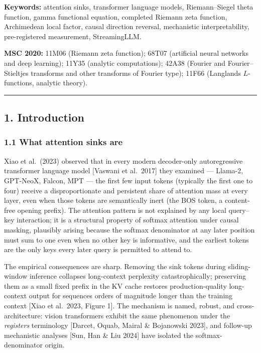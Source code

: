 \documentclass[
  letterpaper,
  11pt]{article}
\theoremstyle{plain}
\theoremstyle{definition}
\theoremstyle{remark}
\begin{document}
{
\setcounter{tocdepth}{3}
\tableofcontents
}
\textbf{Keywords:} attention sinks, transformer language models, Riemann--Siegel theta function, gamma functional equation, completed Riemann zeta function, Archimedean local factor, causal direction reversal, mechanistic interpretability, pre-registered measurement, StreamingLLM.

\textbf{MSC 2020:} 11M06 (Riemann zeta function); 68T07 (artificial neural networks and deep learning); 11Y35 (analytic computations); 42A38 (Fourier and Fourier--Stieltjes transforms and other transforms of Fourier type); 11F66 (Langlands \(L\)-functions, analytic theory).

\begin{center}\rule{0.5\linewidth}{0.5pt}\end{center}

\subsection{1. Introduction}\label{introduction}

\subsubsection{1.1 What attention sinks are}\label{what-attention-sinks-are}

Xiao et al.~(2023) observed that in every modern decoder-only autoregressive transformer language model {[}Vaswani et al.~2017{]} they examined --- Llama-2, GPT-NeoX, Falcon, MPT --- the first few input tokens (typically the first one to four) receive a disproportionate and persistent share of attention mass at every layer, even when those tokens are semantically inert (the BOS token, a content-free opening prefix). The attention pattern is not explained by any local query--key interaction; it is a structural property of softmax attention under causal masking, plausibly arising because the softmax denominator at any later position must sum to one even when no other key is informative, and the earliest tokens are the only keys every later query is permitted to attend to.

The empirical consequences are sharp. Removing the sink tokens during sliding-window inference collapses long-context perplexity catastrophically; preserving them as a small fixed prefix in the KV cache restores production-quality long-context output for sequences orders of magnitude longer than the training context {[}Xiao et al.~2023, Figure 1{]}. The mechanism is named, robust, and cross-architecture: vision transformers exhibit the same phenomenon under the \emph{registers} terminology {[}Darcet, Oquab, Mairal \& Bojanowski 2023{]}, and follow-up mechanistic analyses {[}Sun, Han \& Liu 2024{]} have isolated the softmax-denominator origin.
\end{document}
